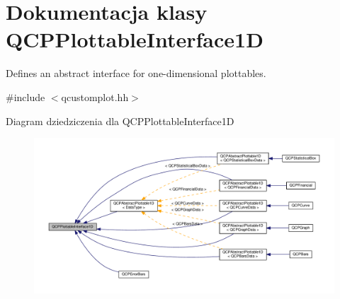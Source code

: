\hypertarget{class_q_c_p_plottable_interface1_d}{}\section{Dokumentacja klasy Q\+C\+P\+Plottable\+Interface1D}
\label{class_q_c_p_plottable_interface1_d}


Defines an abstract interface for one-\/dimensional plottables.  




{\ttfamily \#include $<$qcustomplot.\+hh$>$}



Diagram dziedziczenia dla Q\+C\+P\+Plottable\+Interface1D\nopagebreak
\begin{figure}[H]
\begin{center}
\leavevmode
\includegraphics[width=350pt]{class_q_c_p_plottable_interface1_d__inherit__graph}
\end{center}
\end{figure}
